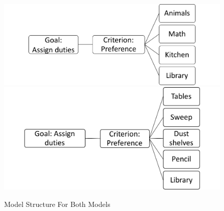 \documentclass[11pt]{article}
\begin{document}
\begin{figure}[!hbt]
\caption{Model Structure For Both Models}
\begin{framed}
\begin{minipage}[c]{0.5\textwidth}
\includegraphics[width=\textwidth]{Picture1}
\end{minipage}
\begin{minipage}[c]{0.5\textwidth}
\includegraphics[width=\textwidth]{Picture2}
\end{minipage}
\label{fig:hier}
\end{framed}
\end{figure}
\end{document}
